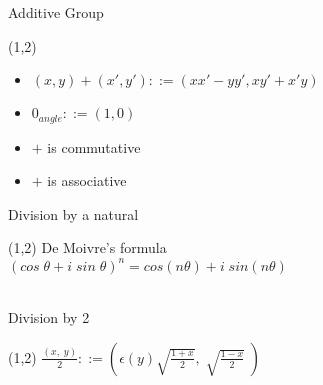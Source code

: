 \documentclass{beamer}
\begin{document}
\begin{frame}{Additive Group}
  \begin{textblock}{7}(1,2)
    \begin{itemize}
    \item $(x, y) + (x', y') ::= (x x' - y y', x y' + x' y)$
    \item $0_{angle} ::= (1, 0)$
    \item $+$ is commutative
    \item $+$ is associative
    \end{itemize}
  \end{textblock}
\end{frame}

\begin{frame}{Division by a natural}
  \begin{textblock}{7}(1,2)
    De Moivre's formula \\
    \hspace{5mm} $(cos \; \theta + i \; sin \; \theta)^n = cos (n
    \theta) + i \; sin (n \theta)$ \\
    \ \\
  \end{textblock}
\end{frame}

\begin{frame}{Division by 2}
  \begin{textblock}{8}(1,2)
    $\displaystyle \frac{(x, \; y)}{2} ::=
    \left( \epsilon (y) \sqrt{\frac{1 + x}{2}}, \; \sqrt{\frac{1 -
        x}{2}} \; \right)$
    \\
  \end{textblock}
\end{frame}
\end{document}
